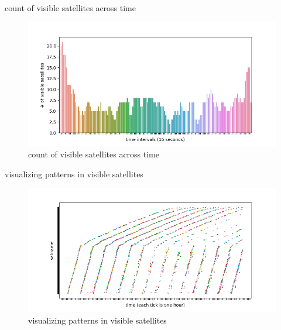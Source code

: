 \documentclass[NET,english,beameralt]{tumbeamer}
\begin{document}
\begin{frame}{count of visible satellites across time}
    \begin{figure}
        \includegraphics[width=1\textwidth]{pics/count_visible_satellites.png}
        \caption[short]{count of visible satellites across time}
    \end{figure}
\end{frame}

\begin{frame}{visualizing patterns in visible satellites}
    \begin{figure}
        \includegraphics[width=1\textwidth]{pics/visualizing-how-long-satellites-are-visible-for.png}
        \caption[short]{visualizing patterns in visible satellites}
    \end{figure}
\end{frame}
\end{document}

